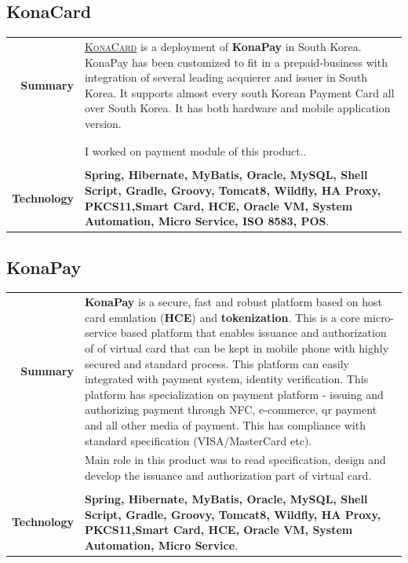 \documentclass[a4paper,10pt]{article}
\begin{document}
\subsection*{KonaCard}
\begin{tabular}{r|p{13cm}}
\textbf{Summary}&{\textsc{\href{http://www.konacard.co.kr/}{KonaCard}}} is a deployment of \textbf{KonaPay} in South Korea. KonaPay has been customized to fit in a prepaid-business with integration of several leading acquierer and issuer in South Korea. It supports almost every south Korean Payment Card all over South Korea. It has both hardware and mobile application version.\\\\
\\&I worked on payment module of this product.. \\\\

\textbf{Technology}& \textbf{Spring, Hibernate, MyBatis, Oracle, MySQL, Shell Script, Gradle, Groovy, Tomcat8, Wildfly, HA Proxy, PKCS11,Smart Card, HCE, Oracle VM, System Automation, Micro Service, ISO 8583, POS}. \\    
\end{tabular}


\subsection*{KonaPay}
\begin{tabular}{r|p{13cm}}
\textbf{Summary}&\textbf{KonaPay} is a secure, fast and robust platform based on host card emulation (\textbf{HCE}) and \textbf{tokenization}. This is a core micro-service based platform that enables issuance and authorization of of virtual card that can be kept in mobile phone with highly secured and standard process. This platform can easily integrated with payment system, identity verification. This platform has specialization on payment platform - issuing and authorizing payment through NFC, e-commerce, qr payment and all other media of payment. This has compliance with standard specification (VISA/MasterCard etc).

\\&Main role in this product was to read specification, design and develop the issuance and authorization part of virtual card. \\\\


\textbf{Technology}& \textbf{Spring, Hibernate, MyBatis, Oracle, MySQL, Shell Script, Gradle, Groovy, Tomcat8, Wildfly, HA Proxy, PKCS11,Smart Card, HCE, Oracle VM, System Automation, Micro Service}. \\    
\end{tabular}
\end{document}
